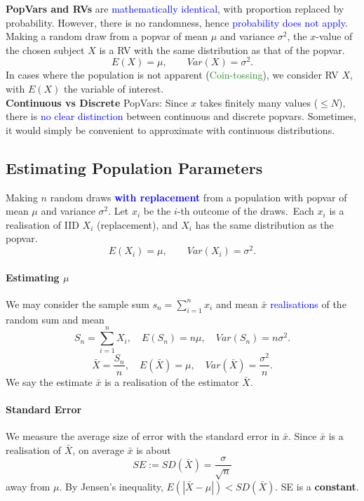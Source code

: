 \textbf{PopVars and RVs} are \textcolor{Blue}{mathematically identical},
with proportion replaced by probability. However, there is no randomness,
hence \textcolor{Blue}{probability does not apply}.\\
Making a random draw from a popvar of mean $\mu$ and variance $\sigma^{2}$, the
$x$-value of the chosen subject $X$ is a RV with the
\textcolor{Bittersweet}{same distribution} as that of the popvar.
\[E(X)=\mu,\qquad Var(X)=\sigma^{2}.\]
In cases where the population is not apparent
(\textcolor{ForestGreen}{Coin-tossing}), we consider RV $X$, with $E(X)$ the
variable of interest.\\
\textbf{Continuous vs Discrete} PopVars: Since $x$ takes finitely many values
($\le N$), there is \textcolor{Blue}{no clear distinction} between continuous
and discrete popvars. Sometimes, it would simply be convenient to approximate
with continuous distributions.


\subsection{Estimating Population Parameters}
Making $n$ random draws \textcolor{Blue}{\textbf{with replacement}} from a
population with popvar of mean $\mu$ and variance $\sigma^{2}$. Let $x_i$ be
the $i$-th outcome of the draws.\ \textcolor{Bittersweet}{Each $x_i$ is a
realisation of IID $X_i$} (replacement), and $X_i$ has the same distribution as
the popvar.
\[E(X_i)=\mu,\qquad Var(X_i)=\sigma^{2}.\]

\paragraph{Estimating $\mu$}
We may consider the sample sum $s_{n}=\sum_{i=1}^{n} x_i$ and mean $\bar{x}$
\textcolor{Blue}{realisations} of the random sum and mean 
\[S_{n}=\sum_{i=1}^{n}X_i,\quad E(S_{n})=n\mu,\quad Var(S_{n})=n \sigma^{2}.\] 
\[\bar{X}=\frac{S_{n}}{n},\quad E(\bar{X})=\mu,\quad Var(\bar{X})=\frac{\sigma^{2}}{n}.\] 
We say the \textcolor{Bittersweet}{estimate} $\bar{x}$ is a realisation of the
\textcolor{Bittersweet}{estimator} $\bar{X}$.

\paragraph{Standard Error}
We measure the average size of error with the \textcolor{Bittersweet}{standard
error} in $\bar{x}$.  Since $\bar{x}$ is a realisation of $\bar{X}$, on average
$\bar{x}$ is about \[SE:=SD(\bar{X})=\frac{\sigma}{\sqrt{n}}\] away from $\mu$.
By Jensen's inequality, $E \left( \left| \bar{X}-\mu \right|  \right)<SD(\bar{X})$.
SE is a \textbf{constant}.

